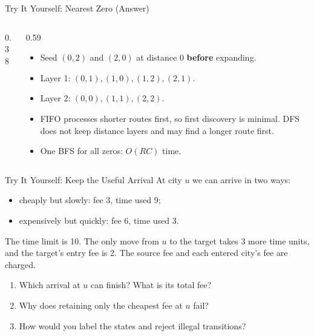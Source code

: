 \documentclass{beamer}
\begin{document}
\begin{frame}{Try It Yourself: Nearest Zero (Answer)}
  \begin{columns}[c]
    \begin{column}{0.38\textwidth}
      \centering
    \end{column}
    \begin{column}{0.59\textwidth}
      \begin{itemize}
        \item Seed $(0,2)$ and $(2,0)$ at distance 0 \textbf{before} expanding.
        \item Layer 1: $(0,1),(1,0),(1,2),(2,1)$.
        \item Layer 2: $(0,0),(1,1),(2,2)$.
        \item FIFO processes shorter routes first, so first discovery is minimal.
          DFS does not keep distance layers and may find a longer route first.
        \item One BFS for all zeros: $O(RC)$ time.
      \end{itemize}
    \end{column}
  \end{columns}
\end{frame}

\begin{frame}{Try It Yourself: Keep the Useful Arrival}
  At city $u$ we can arrive in two ways:
  \begin{itemize}
    \item cheaply but slowly: fee 3, time used 9;
    \item expensively but quickly: fee 6, time used 3.
  \end{itemize}
  The time limit is 10. The only move from $u$ to the target takes 3 more time units,
  and the target's entry fee is 2. The source fee and each entered city's fee are charged.
  \begin{enumerate}
    \item Which arrival at $u$ can finish? What is its total fee?
    \item Why does retaining only the cheapest fee at $u$ fail?
    \item How would you label the states and reject illegal transitions?
  \end{enumerate}
\end{frame}
\end{document}
